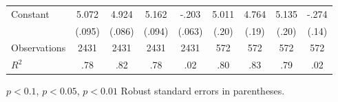 \begin{table}
\begin{threeparttable}
\begin{tabular}{l*{8}{c}}
Constant            &       5.072\sym{**}&       4.924\sym{**}&       5.162\sym{**}&       -.203\sym{**}&       5.011\sym{**}&       4.764\sym{**}&       5.135\sym{**}&       -.274\sym{*} \\
                    &      (.095)        &      (.086)        &      (.094)        &      (.063)        &       (.20)        &       (.19)        &       (.20)        &       (.14)        \\
\midrule
Observations        &        2431        &        2431        &        2431        &        2431        &         572        &         572        &         572        &         572        \\
\(R^{2}\)           &         .78        &         .82        &         .78        &         .02        &         .80        &         .83        &         .79        &         .02        \\
\bottomrule \end{tabular}         \begin{tablenotes}                 \small \item \sym{+} \(p<0.1\), \sym{*} \(p<0.05\), \sym{**} \(p<0.01\) Robust standard errors in parentheses. \\                 \end{tablenotes}  \end{threeparttable} \end{table} 
